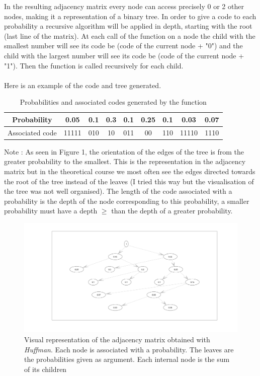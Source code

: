 \documentclass[a4paper,12pt]{article}
\begin{document}
In the resulting adjacency matrix every node can access precisely 0 or 2 other nodes, making it a representation of a binary tree. In order to give a code to each probability a recursive algorithm  will be applied in depth, starting with the root (last line of the matrix). At each call of the function on a node the child with the smallest number will see its code be (code of the current node + "0") and the child with the largest number will see its code be (code of the current node + "1"). Then the function is called recursively for each child.\\ ~\\

Here is an example of the code and tree generated.

\begin{table}[!h]
\begin{center}
\begin{tabular}{|c|c|c|c|c|c|c|c|c|}

\hline 
Probability  & 0.05  & 0.1 & 0.3 & 0.1 & 0.25 & 0.1 & 0.03 & 0.07 \\ 
\hline 
Associated code & 11111 & 010 & 10 & 011 & 00 & 110 & 11110 & 1110 \\ 
\hline 
\end{tabular}
\caption{Probabilities and associated codes generated by the function} 
\end{center}
\end{table}

Note : As seen in Figure 1, the orientation of the edges of the tree is from the greater probability to the smallest. This is the representation in the adjacency matrix but in the theoretical course we most often see the edges directed towards the root of the tree instead of the leaves (I tried this way but the visualisation of the tree was not well organised). The length of the code associated with a probability is the depth of the node corresponding to this probability, a smaller probability must have a depth $\geq$ than the depth of a greater probability. 

\begin{figure} [h!]
\begin{center}
  \includegraphics[scale=0.25]{large2.png}
  \caption{Visual representation of the adjacency matrix obtained with \textit{Huffman}. Each node is associated with a probability. The leaves are the probabilities given as argument. Each internal node is the sum of its children}
  \label{fig:--}
 \end{center}
\end{figure}
\end{document}
